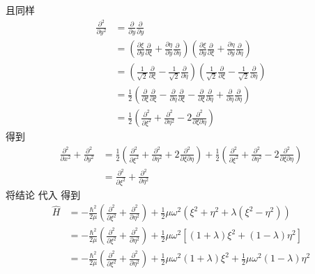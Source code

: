 且同样
\begin{equation}
    \begin{aligned}
        \frac{\partial ^2}{\partial y^2}&=\frac{\partial}{\partial y}\frac{\partial}{\partial y}
\\
&=\left( \frac{\partial \xi}{\partial y}\frac{\partial}{\partial \xi}+\frac{\partial \eta}{\partial y}\frac{\partial}{\partial \eta} \right) \left( \frac{\partial \xi}{\partial y}\frac{\partial}{\partial \xi}+\frac{\partial \eta}{\partial y}\frac{\partial}{\partial \eta} \right) 
\\
&=\left( \frac{1}{\sqrt{2}}\frac{\partial}{\partial \xi}-\frac{1}{\sqrt{2}}\frac{\partial}{\partial \eta} \right) \left( \frac{1}{\sqrt{2}}\frac{\partial}{\partial \xi}-\frac{1}{\sqrt{2}}\frac{\partial}{\partial \eta} \right) 
\\
&=\frac{1}{2}\left( \frac{\partial}{\partial \xi}\frac{\partial}{\partial \xi}-\frac{\partial}{\partial \eta}\frac{\partial}{\partial \xi}-\frac{\partial}{\partial \xi}\frac{\partial}{\partial \eta}+\frac{\partial}{\partial \eta}\frac{\partial}{\partial \eta} \right) 
\\
&=\frac{1}{2}\left( \frac{\partial ^2}{\partial \xi ^2}+\frac{\partial ^2}{\partial \eta ^2}-2\frac{\partial ^2}{\partial \xi \partial \eta} \right) 
    \end{aligned}
\end{equation}
得到
\begin{equation}
    \begin{aligned}
        \frac{\partial ^2}{\partial x^2}+\frac{\partial ^2}{\partial y^2}&=\frac{1}{2}\left( \frac{\partial ^2}{\partial \xi ^2}+\frac{\partial ^2}{\partial \eta ^2}+2\frac{\partial ^2}{\partial \xi \partial \eta} \right) +\frac{1}{2}\left( \frac{\partial ^2}{\partial \xi ^2}+\frac{\partial ^2}{\partial \eta ^2}-2\frac{\partial ^2}{\partial \xi \partial \eta} \right) 
\\
&=\frac{\partial ^2}{\partial \xi ^2}+\frac{\partial ^2}{\partial \eta ^2}
    \end{aligned}
\end{equation}
将结论
代入
得到
\begin{equation}
    \begin{aligned}
        \hat{H}&=-\frac{\hbar ^2}{2\mu}\left( \frac{\partial ^2}{\partial \xi ^2}+\frac{\partial ^2}{\partial \eta ^2} \right) +\frac{1}{2}\mu \omega ^2\left( \xi ^2+\eta ^2+\lambda \left( \xi ^2-\eta ^2 \right) \right) 
\\
&=-\frac{\hbar ^2}{2\mu}\left( \frac{\partial ^2}{\partial \xi ^2}+\frac{\partial ^2}{\partial \eta ^2} \right) +\frac{1}{2}\mu \omega ^2\left[ \left( 1+\lambda \right) \xi ^2+\left( 1-\lambda \right) \eta ^2 \right] 
\\
&=-\frac{\hbar ^2}{2\mu}\left( \frac{\partial ^2}{\partial \xi ^2}+\frac{\partial ^2}{\partial \eta ^2} \right) +\frac{1}{2}\mu \omega ^2\left( 1+\lambda \right) \xi ^2+\frac{1}{2}\mu \omega ^2\left( 1-\lambda \right) \eta ^2
    \end{aligned}
\end{equation}
